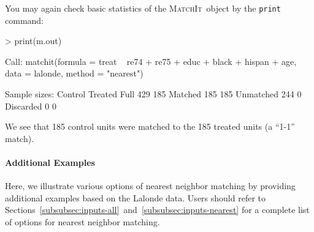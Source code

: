\documentclass[oneside,letterpaper,titlepage]{article}
\newcommand{\MatchIt}{\textsc{MatchIt}}
\begin{document}
\noindent You may again check basic statistics of the \MatchIt\ object by the
\texttt{print} command:
\begin{Schunk}
\begin{Sinput}
> print(m.out)
\end{Sinput}
\begin{Soutput}
Call: 
matchit(formula = treat ~ re74 + re75 + educ + black + hispan + 
    age, data = lalonde, method = "nearest")



Sample sizes:
          Control Treated
Full          429     185
Matched       185     185
Unmatched     244       0
Discarded       0       0
\end{Soutput}
\end{Schunk}

We see that 185 control units were matched to the 185 treated units (a
``1-1'' match).  

\paragraph{Additional Examples}
Here, we illustrate various options of nearest neighbor matching by
providing additional examples based on the Lalonde data. Users should
refer to
Sections~\ref{subsubsec:inputs-all}~and~\ref{subsubsec:inputs-nearest}
for a complete list of options for nearest neighbor matching.
\end{document}
